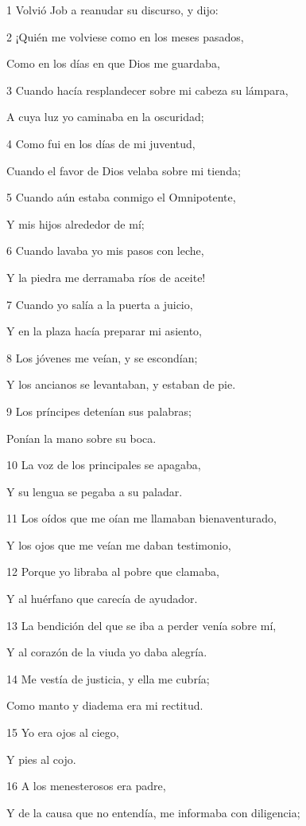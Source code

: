 \par 1 Volvió Job a reanudar su discurso, y dijo:
\par 2 ¡Quién me volviese como en los meses pasados,
\par Como en los días en que Dios me guardaba,
\par 3 Cuando hacía resplandecer sobre mi cabeza su lámpara,
\par A cuya luz yo caminaba en la oscuridad;
\par 4 Como fui en los días de mi juventud,
\par Cuando el favor de Dios velaba sobre mi tienda; 
\par 5 Cuando aún estaba conmigo el Omnipotente,
\par Y mis hijos alrededor de mí;
\par 6 Cuando lavaba yo mis pasos con leche,
\par Y la piedra me derramaba ríos de aceite!
\par 7 Cuando yo salía a la puerta a juicio,
\par Y en la plaza hacía preparar mi asiento,
\par 8 Los jóvenes me veían, y se escondían;
\par Y los ancianos se levantaban, y estaban de pie.
\par 9 Los príncipes detenían sus palabras;
\par Ponían la mano sobre su boca. 
\par 10 La voz de los principales se apagaba,
\par Y su lengua se pegaba a su paladar.
\par 11 Los oídos que me oían me llamaban bienaventurado,
\par Y los ojos que me veían me daban testimonio,
\par 12 Porque yo libraba al pobre que clamaba,
\par Y al huérfano que carecía de ayudador.
\par 13 La bendición del que se iba a perder venía sobre mí,
\par Y al corazón de la viuda yo daba alegría.
\par 14 Me vestía de justicia, y ella me cubría;
\par Como manto y diadema era mi rectitud. 
\par 15 Yo era ojos al ciego,
\par Y pies al cojo.
\par 16 A los menesterosos era padre,
\par Y de la causa que no entendía, me informaba con diligencia;
